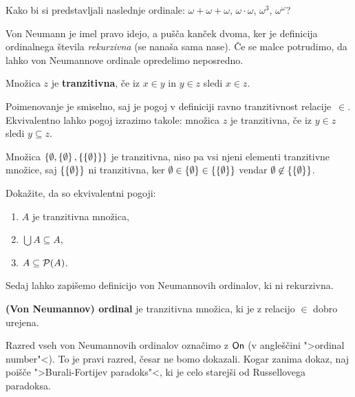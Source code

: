 \begin{vaja}
  Kako bi si predstavljali naslednje ordinale: $\omega + \omega + \omega$, $\omega \cdot \omega$, $\omega^3$, $\omega^\omega$?
\end{vaja}

Von Neumann je imel pravo idejo, a pušča kanček dvoma, ker je definicija ordinalnega števila \emph{rekurzivna} (se nanaša sama nase). Če se malce potrudimo, da lahko von Neumannove ordinale opredelimo neposredno.

\begin{definicija}
  Množica $z$ je \textbf{tranzitivna}, če iz $x \in y$ in $y \in z$ sledi $x \in z$.
\end{definicija}

\noindent
%
Poimenovanje je smiselno, saj je pogoj v definiciji ravno tranzitivnost relacije~$\in$.
Ekvivalentno lahko pogoj izrazimo takole: množica $z$ je tranzitivna, če iz $y \in z$ sledi $y \subseteq z$.

\begin{zgled}
  Množica $\left\{\emptyset, \left\{\emptyset\right\}, \left\{\left\{\emptyset\right\}\right\}\right\}$ je tranzitivna, niso pa vsi njeni elementi tranzitivne množice, saj $\left\{\left\{\emptyset\right\}\right\}$ ni tranzitivna, ker $\emptyset \in \left\{\emptyset\right\} \in \left\{\left\{\emptyset\right\}\right\}$ vendar $\emptyset \not\in \left\{\left\{\emptyset\right\}\right\}$.
\end{zgled}

\begin{vaja}
  Dokažite, da so ekvivalentni pogoji:
  \begin{enumerate}
  \item $A$ je tranzitivna množica,
  \item $\bigcup A \subseteq A$,
  \item $A \subseteq \mathcal{P}(A)$.
  \end{enumerate}
\end{vaja}

Sedaj lahko zapišemo definicijo von Neumannovih ordinalov, ki ni rekurzivna.

\begin{definicija}
  \label{def:von-neuman-ordinal}
  \textbf{(Von Neumannov) ordinal} je tranzitivna množica, ki je z relacijo $\in$ dobro urejena.
\end{definicija}

Razred vseh von Neumannovih ordinalov označimo z $\mathsf{On}$ (v angleščini ">ordinal number"<). To je pravi razred, česar ne bomo dokazali. Kogar zanima dokaz, naj poišče ">Burali-Fortijev paradoks"<, ki je celo starejši od Russellovega paradoksa.

